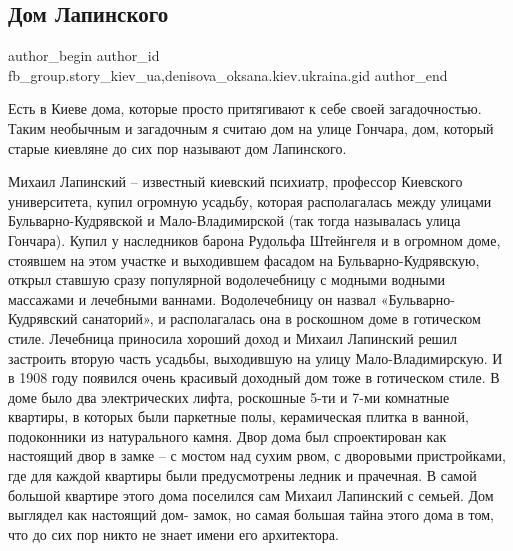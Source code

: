  
 
 
 
 
 
\subsection{Дом Лапинского}
\label{sec:06_09_2021.fb.fb_group.story_kiev_ua.1.dom_lapinskogo}
 
\ifcmt
 author_begin
   author_id fb_group.story_kiev_ua,denisova_oksana.kiev.ukraina.gid
 author_end
\fi

Есть в Киеве дома, которые просто притягивают к себе своей загадочностью. Таким
необычным и загадочным я считаю дом на улице Гончара, дом, который старые
киевляне до сих пор называют дом Лапинского.


Михаил Лапинский – известный киевский психиатр, профессор Киевского
университета, купил огромную усадьбу, которая располагалась между улицами
Бульварно\hyp Кудрявской и Мало\hyp Владимирской (так тогда называлась улица Гончара).
Купил у наследников барона Рудольфа Штейнгеля и в огромном доме, стоявшем на
этом участке и выходившем фасадом на Бульварно\hyp Кудрявскую, открыл ставшую сразу
популярной водолечебницу с модными водными массажами и лечебными ваннами.
Водолечебницу он назвал «Бульварно-Кудрявский санаторий»,  и располагалась она
в роскошном доме в готическом стиле. Лечебница приносила хороший доход и
Михаил Лапинский решил застроить вторую часть усадьбы, выходившую на улицу
Мало\hyp Владимирскую. И в 1908 году появился очень красивый доходный дом тоже в
готическом стиле. В доме  было два электрических лифта, роскошные 5-ти и 7-ми
комнатные квартиры, в которых были  паркетные полы, керамическая плитка в
ванной, подоконники из натурального камня. Двор дома был спроектирован как
настоящий двор в замке – с мостом над сухим рвом, с дворовыми пристройками, где
для каждой квартиры были предусмотрены ледник и прачечная. В самой большой
квартире этого дома поселился сам Михаил Лапинский с семьей. Дом выглядел как
настоящий дом- замок, но самая большая тайна этого дома в том, что до сих пор
никто не знает имени его архитектора.

